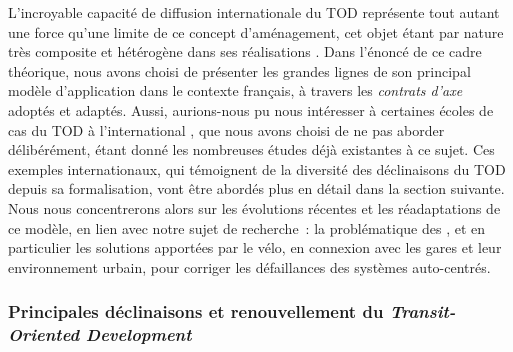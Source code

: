 \begin{refsegment}
L’incroyable capacité de diffusion internationale du \acrshort{TOD} représente tout autant une force qu'une limite de ce concept d’aménagement, cet objet étant par nature très composite et hétérogène dans ses réalisations \textcolor{blue}{\autocite[49]{bentayou_transit-oriented_2015}}. Dans l'énoncé de ce cadre théorique, nous avons choisi de présenter les grandes lignes de son principal modèle d’application dans le contexte français, à travers les \textsl{contrats d’axe} adoptés et adaptés. Aussi, aurions-nous pu nous intéresser à certaines écoles de cas du \acrshort{TOD} à l'international \textcolor{blue}{\autocite[6]{knowles_transports_2020}}, que nous avons choisi de ne pas aborder délibérément, étant donné les nombreuses études déjà existantes à ce sujet. Ces exemples internationaux, qui témoignent de la diversité des déclinaisons du \acrshort{TOD} depuis sa formalisation, vont être abordés plus en détail dans la section suivante. Nous nous concentrerons alors sur les évolutions récentes et les réadaptations de ce modèle, en lien avec notre sujet de recherche~: la problématique des , et en particulier les solutions apportées par le vélo, en connexion avec les gares et leur environnement urbain, pour corriger les défaillances des systèmes auto-centrés.%

\subsubsection*{Principales déclinaisons et renouvellement du \textsl{Transit-Oriented Development}
    \label{chap1:tod-presentation-generale-declinaisons-hybrids}
    }


\end{refsegment}

